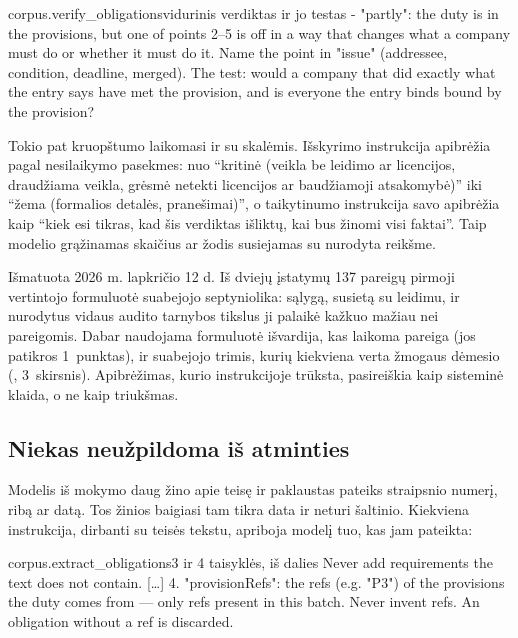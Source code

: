 \begin{promptexcerpt}{corpus.verify_obligations}{vidurinis verdiktas ir jo testas}
- "partly": the duty is in the provisions, but one of points 2–5 is off in a way that changes what a company must do or whether it must do it. Name the point in "issue" (addressee, condition, deadline, merged). The test: would a company that did exactly what the entry says have met the provision, and is everyone the entry binds bound by the provision?
\end{promptexcerpt}

Tokio pat kruopštumo laikomasi ir su skalėmis. Išskyrimo instrukcija  apibrėžia
pagal nesilaikymo pasekmes: nuo \enquote{kritinė (veikla be leidimo ar licencijos, draudžiama
veikla, grėsmė netekti licencijos ar baudžiamoji atsakomybė)} iki \enquote{žema (formalios
detalės, pranešimai)}, o taikytinumo instrukcija savo  apibrėžia kaip
\enquote{kiek esi tikras, kad šis verdiktas išliktų, kai bus žinomi visi faktai}. Taip modelio
grąžinamas skaičius ar žodis susiejamas su nurodyta reikšme.

\begin{lessonbox}{Išmatuota 2026 m. lapkričio 12 d.}
Iš dviejų įstatymų 137 pareigų pirmoji vertintojo formuluotė suabejojo septyniolika: sąlygą,
susietą su leidimu, ir nurodytus vidaus audito tarnybos tikslus ji palaikė kažkuo mažiau nei
pareigomis. Dabar naudojama formuluotė išvardija, kas laikoma pareiga (jos patikros 1~punktas),
ir suabejojo trimis, kurių kiekviena verta žmogaus dėmesio (,
3~skirsnis). Apibrėžimas, kurio instrukcijoje trūksta, pasireiškia kaip sisteminė klaida, o ne
kaip triukšmas.
\end{lessonbox}

\subsection{Niekas neužpildoma iš atminties}

Modelis iš mokymo daug žino apie teisę ir paklaustas pateiks straipsnio numerį, ribą ar datą.
Tos žinios baigiasi tam tikra data ir neturi šaltinio. Kiekviena instrukcija, dirbanti su teisės
tekstu, apriboja modelį tuo, kas jam pateikta:

\begin{promptexcerpt}{corpus.extract_obligations}{3 ir 4 taisyklės, iš dalies}
Never add
   requirements the text does not contain.
[…]
4. "provisionRefs": the refs (e.g. "P3") of the provisions the duty comes from —
   only refs present in this batch. Never invent refs. An obligation without a ref
   is discarded.
\end{promptexcerpt}

